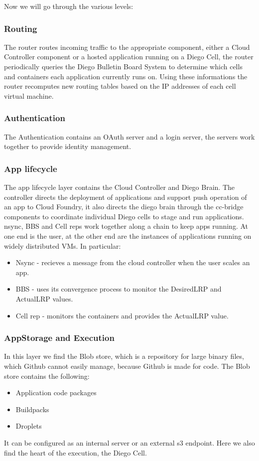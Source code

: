 Now we will go through the various levels:
\subsubsection{Routing}
The router routes incoming traffic to the appropriate component, either a Cloud Controller component or a hosted application running on a Diego Cell, the router periodically queries the Diego Bulletin Board System to determine which cells and containers each application currently runs on. Using these informations the router recomputes new routing tables based on the IP addresses of each cell virtual machine.
\subsubsection{Authentication}
The Authentication contains an OAuth server and a login server, the servers work together to provide identity management.
\subsubsection{App lifecycle}
The app lifecycle layer contains the Cloud Controller and Diego Brain. The controller directs the deployment of applications and support push operation of an app to Cloud Foundry, it also directs the diego brain through the cc-bridge components to coordinate individual Diego cells to stage and run applications. \n
nsync, BBS and Cell reps work together along a chain to keep apps running. At one end is the user, at the other end are the instances of applications running on widely distributed VMs. In particular:
\begin{itemize}
    \item Nsync - recieves a message from the cloud controller when the user scales an app.
    \item BBS - uses its convergence process to monitor the DesiredLRP and ActualLRP values.
    \item Cell rep - monitors the containers and provides the ActualLRP value.
\end{itemize}
\subsubsection{AppStorage and Execution}
In this layer we find the Blob store, which is a repository for large binary files, which Github cannot easily manage, because Github is made for code. The Blob store contains the following:
\begin{itemize}
    \item Application code packages
    \item Buildpacks
    \item Droplets
\end{itemize}
It can be configured as an internal server or an external s3 endpoint. \n
Here we also find the heart of the execution, the Diego Cell.
